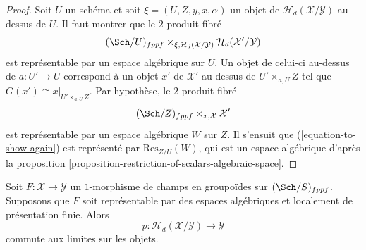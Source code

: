 \begin{proof}
Soit $U$ un schéma et soit $\xi = (U, Z, y, x, \alpha)$ un objet de
$\mathcal{H}_d(\mathcal{X}/\mathcal{Y})$ au-dessus de $U$.
Il faut montrer que le $2$-produit fibré
\begin{equation}
\label{equation-to-show-again}
(\Sch/U)_{fppf}
\times_{\xi, \mathcal{H}_d(\mathcal{X}/\mathcal{Y})}
\mathcal{H}_d(\mathcal{X}'/\mathcal{Y})
\end{equation}
est représentable par un espace algébrique sur $U$.
Un objet de celui-ci au-dessus de $a : U' \to U$ correspond à un objet
$x'$ de $\mathcal{X}'$ au-dessus de $U' \times_{a, U} Z$ tel que
$G(x') \cong x|_{U' \times_{a, U} Z}$. Par hypothèse, le $2$-produit fibré
$$
(\Sch/Z)_{fppf} \times_{x, \mathcal{X}} \mathcal{X}'
$$
est représentable par un espace algébrique $W$ sur $Z$. Il s'ensuit que
(\ref{equation-to-show-again}) est représenté par $\text{Res}_{Z/U}(W)$,
qui est un espace algébrique d'après la
proposition \ref{proposition-restriction-of-scalars-algebraic-space}.
\end{proof}

\begin{lemma}
\label{lemma-limit-preserving}
Soit $F : \mathcal{X} \to \mathcal{Y}$ un $1$-morphisme de champs en groupoïdes
sur $(\Sch/S)_{fppf}$. Supposons que $F$ soit représentable par des espaces
algébriques et localement de présentation finie. Alors
$$
p : \mathcal{H}_d(\mathcal{X}/\mathcal{Y}) \to \mathcal{Y}
$$
commute aux limites sur les objets.
\end{lemma}

